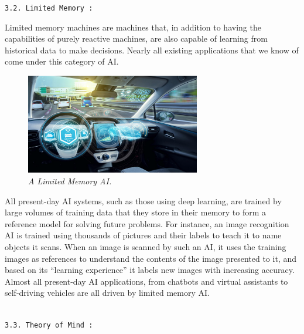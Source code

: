 \documentclass{article}
\begin{document}
\begin{large}
\texttt{3.2. Limited Memory :}
\end{large}


Limited memory machines are machines that, in addition to having the capabilities of purely reactive machines, are also capable of learning from historical data to make decisions. Nearly all existing applications that we know of come under this category of AI.

\begin{figure}
\centering
\includegraphics[width=3in]{Limited-Memory-AI-Types-Of-Artificial-Intelligence}
\caption{\textit{A Limited Memory AI.}}
\end{figure}


 All present-day AI systems, such as those using deep learning, are trained by large volumes of training data that they store in their memory to form a reference model for solving future problems. For instance, an image recognition AI is trained using thousands of pictures and their labels to teach it to name objects it scans. When an image is scanned by such an AI, it uses the training images as references to understand the contents of the image presented to it, and based on its “learning experience” it labels new images with increasing accuracy.\\



Almost all present-day AI applications, from chatbots and virtual assistants to self-driving vehicles are all driven by limited memory AI.\\\\

\begin{large}
\texttt{3.3. Theory of Mind :}
\end{large}
\end{document}
